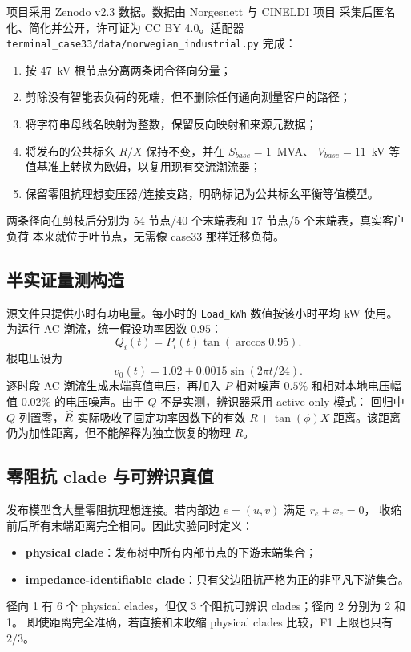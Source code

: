 项目采用 Zenodo v2.3 数据\cite{sandell2023}。数据由 Norgesnett 与 CINELDI 项目
采集后匿名化、简化并公开，许可证为 CC BY 4.0。适配器
\texttt{terminal\_case33/data/norwegian\_industrial.py} 完成：
\begin{enumerate}
  \item 按 47~kV 根节点分离两条闭合径向分量；
  \item 剪除没有智能表负荷的死端，但不删除任何通向测量客户的路径；
  \item 将字符串母线名映射为整数，保留反向映射和来源元数据；
  \item 将发布的公共标幺 $R/X$ 保持不变，并在 $S_{base}=1$~MVA、
  $V_{base}=11$~kV 等值基准上转换为欧姆，以复用现有交流潮流器；
  \item 保留零阻抗理想变压器/连接支路，明确标记为公共标幺平衡等值模型。
\end{enumerate}

两条径向在剪枝后分别为 54 节点/40 个末端表和 17 节点/5 个末端表，真实客户负荷
本来就位于叶节点，无需像 case33 那样迁移负荷。

\subsection{半实证量测构造}

源文件只提供小时有功电量。每小时的 \texttt{Load\_kWh} 数值按该小时平均 kW 使用。
为运行 AC 潮流，统一假设功率因数 $0.95$：
\[
Q_i(t)=P_i(t)\tan(\arccos 0.95).
\]
根电压设为
\[
v_0(t)=1.02+0.0015\sin(2\pi t/24).
\]
逐时段 AC 潮流生成末端真值电压，再加入 $P$ 相对噪声 $0.5\%$ 和相对本地电压幅值
$0.02\%$ 的电压噪声。由于 $Q$ 不是实测，辨识器采用 active-only 模式：
回归中 $Q$ 列置零，$\widehat{R}$ 实际吸收了固定功率因数下的有效
$R+\tan(\phi)X$ 距离。该距离仍为加性距离，但不能解释为独立恢复的物理 $R$。

\subsection{零阻抗 clade 与可辨识真值}

发布模型含大量零阻抗理想连接。若内部边 $e=(u,v)$ 满足 $r_e+x_e=0$，
收缩前后所有末端距离完全相同。因此实验同时定义：
\begin{itemize}
  \item \textbf{physical clade}：发布树中所有内部节点的下游末端集合；
  \item \textbf{impedance-identifiable clade}：只有父边阻抗严格为正的非平凡下游集合。
\end{itemize}
径向 1 有 6 个 physical clades，但仅 3 个阻抗可辨识 clades；径向 2 分别为 2 和 1。
即使距离完全准确，若直接和未收缩 physical clades 比较，F1 上限也只有 $2/3$。

